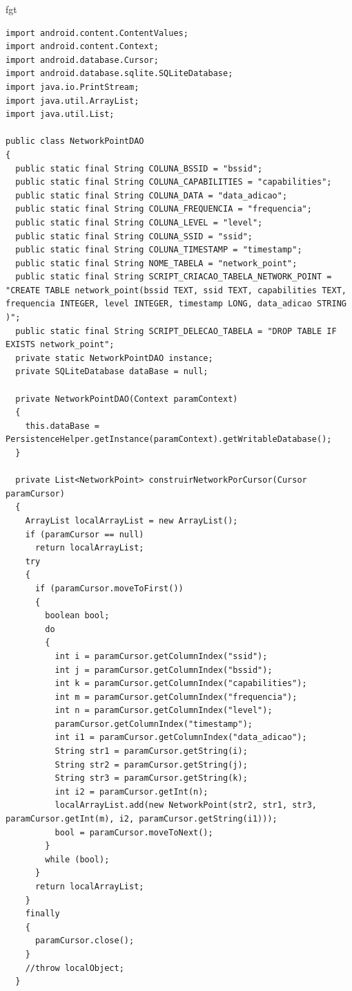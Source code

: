 fgt\documentclass[12pt, %
openright, 
oneside, %
a4paper,    %
brazil]{facom-ufu-abntex2}
\begin{document}
\begin{anexosenv}
\begin{lstlisting}
import android.content.ContentValues;
import android.content.Context;
import android.database.Cursor;
import android.database.sqlite.SQLiteDatabase;
import java.io.PrintStream;
import java.util.ArrayList;
import java.util.List;

public class NetworkPointDAO
{
  public static final String COLUNA_BSSID = "bssid";
  public static final String COLUNA_CAPABILITIES = "capabilities";
  public static final String COLUNA_DATA = "data_adicao";
  public static final String COLUNA_FREQUENCIA = "frequencia";
  public static final String COLUNA_LEVEL = "level";
  public static final String COLUNA_SSID = "ssid";
  public static final String COLUNA_TIMESTAMP = "timestamp";
  public static final String NOME_TABELA = "network_point";
  public static final String SCRIPT_CRIACAO_TABELA_NETWORK_POINT = "CREATE TABLE network_point(bssid TEXT, ssid TEXT, capabilities TEXT, frequencia INTEGER, level INTEGER, timestamp LONG, data_adicao STRING )";
  public static final String SCRIPT_DELECAO_TABELA = "DROP TABLE IF EXISTS network_point";
  private static NetworkPointDAO instance;
  private SQLiteDatabase dataBase = null;

  private NetworkPointDAO(Context paramContext)
  {
    this.dataBase = PersistenceHelper.getInstance(paramContext).getWritableDatabase();
  }

  private List<NetworkPoint> construirNetworkPorCursor(Cursor paramCursor)
  {
    ArrayList localArrayList = new ArrayList();
    if (paramCursor == null)
      return localArrayList;
    try
    {
      if (paramCursor.moveToFirst())
      {
        boolean bool;
        do
        {
          int i = paramCursor.getColumnIndex("ssid");
          int j = paramCursor.getColumnIndex("bssid");
          int k = paramCursor.getColumnIndex("capabilities");
          int m = paramCursor.getColumnIndex("frequencia");
          int n = paramCursor.getColumnIndex("level");
          paramCursor.getColumnIndex("timestamp");
          int i1 = paramCursor.getColumnIndex("data_adicao");
          String str1 = paramCursor.getString(i);
          String str2 = paramCursor.getString(j);
          String str3 = paramCursor.getString(k);
          int i2 = paramCursor.getInt(n);
          localArrayList.add(new NetworkPoint(str2, str1, str3, paramCursor.getInt(m), i2, paramCursor.getString(i1)));
          bool = paramCursor.moveToNext();
        }
        while (bool);
      }
      return localArrayList;
    }
    finally
    {
      paramCursor.close();
    }
    //throw localObject;
  }


\end{lstlisting}
\end{anexosenv}
\end{document}
